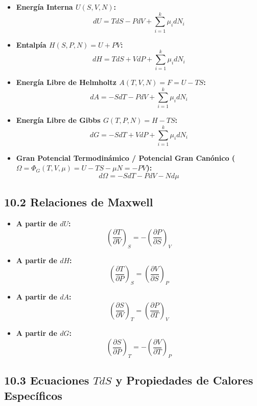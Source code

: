 \documentclass[11pt,a4paper]{article}
\begin{document}
\begin{itemize}
  \item \textbf{Energía Interna $U(S, V, N)$:}
  \[
    dU = T dS - P dV + \sum_{i=1}^k \mu_i dN_i
  \]
  \item \textbf{Entalpía $H(S, P, N) = U + PV$:}
  \[
    dH = T dS + V dP + \sum_{i=1}^k \mu_i dN_i
  \]
  \item \textbf{Energía Libre de Helmholtz $A(T, V, N) = F = U - TS$:}
  \[
    dA = -S dT - P dV + \sum_{i=1}^k \mu_i dN_i
  \]
  \item \textbf{Energía Libre de Gibbs $G(T, P, N) = H - TS$:}
  \[
    dG = -S dT + V dP + \sum_{i=1}^k \mu_i dN_i
  \]
  \item \textbf{Gran Potencial Termodinámico / Potencial Gran Canónico ($\Omega = \Phi_G(T, V, \mu) = U - TS - \mu N = -PV$):}
  \[
    d\Omega = -S dT - P dV - N d\mu
  \]
\end{itemize}

\subsection*{10.2 Relaciones de Maxwell}

\begin{itemize}
  \item \textbf{A partir de $dU$:}
  \[
    \left( \frac{\partial T}{\partial V} \right)_S = -\left( \frac{\partial P}{\partial S} \right)_V
  \]
  \item \textbf{A partir de $dH$:}
  \[
    \left( \frac{\partial T}{\partial P} \right)_S = \left( \frac{\partial V}{\partial S} \right)_P
  \]
  \item \textbf{A partir de $dA$:}
  \[
    \left( \frac{\partial S}{\partial V} \right)_T = \left( \frac{\partial P}{\partial T} \right)_V
  \]
  \item \textbf{A partir de $dG$:}
  \[
    \left( \frac{\partial S}{\partial P} \right)_T = -\left( \frac{\partial V}{\partial T} \right)_P
  \]
\end{itemize}

\subsection*{10.3 Ecuaciones $T dS$ y Propiedades de Calores Específicos}
\end{document}

